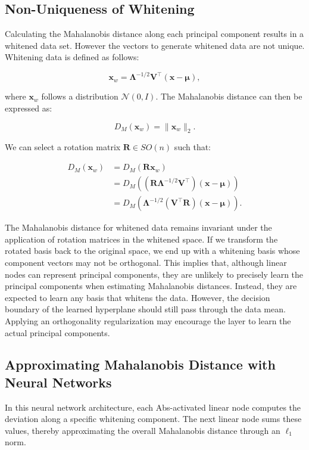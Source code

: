 \subsection{Non-Uniqueness of Whitening}

Calculating the Mahalanobis distance along each principal component results in a whitened data set. However the vectors to generate whitened data are not unique. Whitening data is defined as follows:

\[
\mathbf{x}_w = \boldsymbol{\Lambda}^{-1/2} \mathbf{V}^\top (\mathbf{x} - \boldsymbol{\mu}),
\]

where \(\mathbf{x}_w\) follows a distribution \(\mathcal{N}(0, I)\). The Mahalanobis distance can then be expressed as:

\[
D_M(\mathbf{x}_w) = \|\mathbf{x}_w\|_2.
\]

We can select a rotation matrix \(\mathbf{R} \in SO(n)\) such that:

\begin{align}
    D_M(\mathbf{x}_w) &= D_M(\mathbf{R} \mathbf{x}_w) \\
                      &= D_M\left( (\mathbf{R} \boldsymbol{\Lambda}^{-1/2} \mathbf{V}^\top) (\mathbf{x} - \boldsymbol{\mu}) \right) \\
                      &= D_M\left( \boldsymbol{\Lambda}^{-1/2} (\mathbf{V}^\top \mathbf{R}) (\mathbf{x} - \boldsymbol{\mu}) \right).
    \end{align}
    
The Mahalanobis distance for whitened data remains invariant under the application of rotation matrices in the whitened space. If we transform the rotated basis back to the original space, we end up with a whitening basis whose component vectors may not be orthogonal. This implies that, although linear nodes can represent principal components, they are unlikely to precisely learn the principal components when estimating Mahalanobis distances. Instead, they are expected to learn any basis that whitens the data. However, the decision boundary of the learned hyperplane should still pass through the data mean. Applying an orthogonality regularization may encourage the layer to learn the actual principal components.

\subsection{Approximating Mahalanobis Distance with Neural Networks}

In this neural network architecture, each Abs-activated linear node computes the deviation along a specific whitening component. The next linear node sums these values, thereby approximating the overall Mahalanobis distance through an $\ell_1$ norm. 

